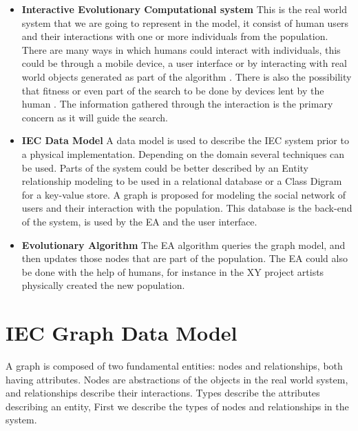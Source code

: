 \documentclass[conference]{IEEEtran}
\begin{document}
\begin{itemize}
  \item {\bf Interactive Evolutionary Computational system} 
  This is the real world system that we are going to represent in the model, 
  it consist of human users and their interactions with one or more individuals
  from
  the population. There are many ways in which humans could interact 
  with individuals, this could be through a mobile device, a user interface 
  or by interacting with real world objects generated as part of the algorithm 
  \cite{de2014artists,de2013unplugging}. 
  There is also the possibility that fitness or even part of the search 
  to be done by devices lent by the human \cite{merelo2016performance}.
  The information gathered through the interaction is the primary concern
  as it will guide the search. 

  \item {\bf IEC Data Model}
  A data model is used to describe the IEC system prior to a physical 
  implementation. 
  Depending on the domain several techniques can be used.
  Parts of the system could be better described by an Entity relationship 
  modeling to be used in a relational database or a Class Digram for a 
  key-value store. 
  A graph is proposed for modeling the social network
  of users and their interaction with the population. This database 
  is the back-end of the system, is used by the EA and the user interface. 

  \item {\bf Evolutionary Algorithm} 
  The EA algorithm queries the graph model, and then updates those nodes that 
  are part of the population. The EA could also be done with the help of
  humans, for instance in the XY project \cite{de2013unplugging} artists physically created
  the new population.  
\end{itemize}

\section{IEC Graph Data Model} 

A graph is composed of two fundamental entities: nodes and relationships,
both having attributes. Nodes are abstractions of the objects in the real 
world system, and relationships describe their interactions. Types describe
the attributes describing an entity, First we describe the types of nodes and
relationships in the system. 
\end{document}
